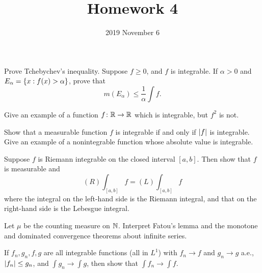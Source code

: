 \documentclass{../homework}
\title{Homework 4}
\author{}
\date{2019 November 6}
\begin{document}
\begin{problems}
\item Prove Tchebychev's inequality.  Suppose \(f \ge 0\), and \(f\)
  is integrable.  If \(\alpha > 0\) and
  \(E_\alpha = \{x : f(x) > \alpha\}\), prove that
  \[
    m(E_\alpha) \le \frac 1 \alpha \int f.
  \]

  \begin{solution}
  \end{solution}

\item
  \begin{problems}
  \item Give an example of a function \(f \colon \mathbb R \to \mathbb R\) which
    is integrable, but \(f^2\) is not.

    \begin{solution}
    \end{solution}

  \item Show that a measurable function \(f\) is integrable if and
    only if \(\lvert f\rvert\) is integrable.  Give an example of a
    nonintegrable function whose absolute value is integrable.

    \begin{solution}
    \end{solution}

  \end{problems}

\item Suppose \(f\) is Riemann integrable on the closed interval
  \([a, b]\).  Then show that \(f\) is measurable and
  \[
    (R) \int_{[a, b]} f = (L) \int_{[a, b]} f
  \]
  where the integral on the left-hand side is the Riemann integral,
  and that on the right-hand side is the Lebesgue integral.

  \begin{solution}
  \end{solution}

\item Let \(\mu\) be the counting measure on \(\mathbb N\).  Interpret
  Fatou's lemma and the monotone and dominated convergence theorems
  about infinite series.

  \begin{solution}
  \end{solution}

\item If \(f_n, g_n, f, g\) are all integrable functions (all in
  \(L^1\)) with \(f_n \to f\) and \(g_n \to g\) a.e.,
  \(\lvert f_n\rvert \le g_n\), and \(\int g_n \to \int g\), then show that
  \(\int f_n \to \int f\).


\end{problems}
\end{document}
